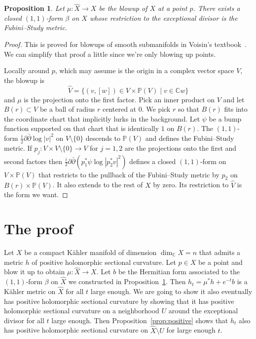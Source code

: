 \documentclass[10pt,a4paper]{amsart}
\newtheorem{prop}[theo]{Proposition}
\newcommand{\kk}[1]{\mathbb{#1}}
\def\hsc{holomorphic sectional curvature}
\def\bl#1{\widehat{#1}}
\begin{document}
\begin{prop}
\label{prop:fs}
Let $\mu : \bl X \to X$ be the blowup of $X$ at a point $p$.
There exists a closed $(1,1)$-form $\beta$ on $X$ whose restriction to
the exceptional divisor is the Fubini--Study metric.
\end{prop}

\begin{proof}
This is proved for blowups of smooth submanifolds in
Voisin's textbook~\cite{voisin2002theorie}. We can simplify that proof a little
since we're only blowing up points.

Locally around $p$, which may assume is the origin in a complex vector space
$V$, the blowup is
$$
\bl V
= \{ (v,[w]) \in V \times \kk P(V) \mid v \in \kk C w \}
$$
and $\mu$ is the projection onto the first factor.
Pick an inner product on $V$ and let $B(r) \subset V$ be a ball of radius $r$
centered at $0$.
We pick $r$ so that $B(r)$ fits into the coordinate chart that implicitly lurks
in the background.
Let $\psi$ be a bump function supported on that chart that is identically $1$
on $B(r)$.
The $(1,1)$-form $\frac i2 \partial\bar\partial \log |v|^2$ on $V \setminus
\{0\}$ descends to $\kk P(V)$ and defines the Fubini--Study metric.
If $p_j : V \times V \setminus \{0\} \to V$ for $j = 1,2$ are the projections
onto the first and second factors then
$\frac i2 \partial \bar\partial (p_1^*\psi \log |p_2^*v|^2)$
defines a closed $(1,1)$-form on $V \times \kk P(V)$ that restricts to the
pullback of the Fubini--Study metric by $p_2$ on $B(r) \times \kk P(V)$.
It also extends to the rest of $X$ by zero.
Its restriction to $\bl V$ is the form we want.
\end{proof}



\section{The proof}

Let $X$ be a compact K\"ahler manifold of dimension $\dim_{\kk C} X = n$ that
admits a metric $h$ of positive \hsc.
Let $p \in X$ be a point and blow it up to obtain $\mu : \bl X \to X$.
Let $b$ be the Hermitian form associated to the $(1,1)$-form $\beta$ on $\bl X$
we constructed in Proposition~\ref{prop:fs}.
Then $h_t = \mu^*h + e^{-t} b$ is a K\"ahler metric on $\bl X$ for all $t$ large
enough.
We are going to show it also eventually has positive \hsc{} by showing
that it has positive \hsc{} on a neighborhood $U$ around the exceptional
divisor for all $t$ large enough.
Then Proposition~\ref{prop:positive} shows that $h_t$ also has positive \hsc{}
on $\bl X \setminus U$ for large enough $t$.
\end{document}
